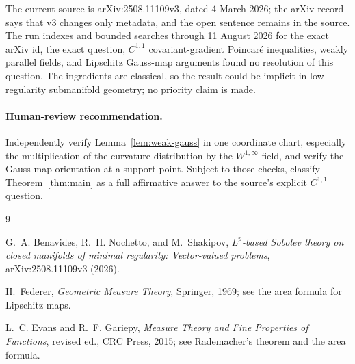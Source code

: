 \documentclass[11pt]{article}
\begin{document}
The current source is arXiv:2508.11109v3, dated 4 March 2026; the arXiv
record says that v3 changes only metadata, and the open sentence remains in
the source.  The run indexes and bounded searches through 11 August 2026 for
the exact arXiv id, the exact question, $C^{1,1}$ covariant-gradient
Poincar\'e inequalities, weakly parallel fields, and Lipschitz Gauss-map
arguments found no resolution of this question.  The ingredients are
classical, so the result could be implicit in low-regularity submanifold
geometry; no priority claim is made.

\paragraph{Human-review recommendation.}
Independently verify Lemma~\ref{lem:weak-gauss} in one coordinate chart,
especially the multiplication of the curvature distribution by the
$W^{1,\infty}$ field, and verify the Gauss-map orientation at a support
point.  Subject to those checks, classify Theorem~\ref{thm:main} as a full
affirmative answer to the source's explicit $C^{1,1}$ question.

\begin{thebibliography}{9}

G.~A. Benavides, R.~H. Nochetto, and M.~Shakipov,
\emph{$L^p$-based Sobolev theory on closed manifolds of minimal regularity:
Vector-valued problems}, arXiv:2508.11109v3 (2026).

H.~Federer,
\emph{Geometric Measure Theory},
Springer, 1969; see the area formula for Lipschitz maps.

L.~C. Evans and R.~F. Gariepy,
\emph{Measure Theory and Fine Properties of Functions}, revised ed.,
CRC Press, 2015; see Rademacher's theorem and the area formula.

\end{thebibliography}
\end{document}
